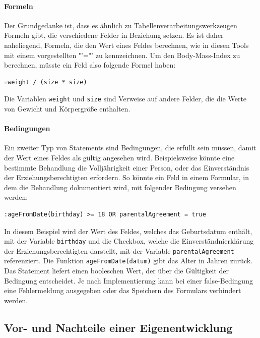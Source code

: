 \paragraph*{Formeln}

Der Grundgedanke ist, dass es ähnlich zu Tabellenverarbeitungs\-werkzeugen Formeln gibt, die verschiedene Felder in Beziehung setzen. Es ist daher naheliegend, Formeln, die den Wert eines Feldes berechnen,	 wie in diesen Tools mit einem vorgestellten "'="' zu kennzeichnen. Um den Body-Mass-Index zu berechnen, müsste ein Feld also folgende Formel haben:

\begin{verbatim}
=weight / (size * size)
\end{verbatim}

Die Variablen \texttt{weight} und \texttt{size} sind Verweise auf andere Felder, die die Werte von Gewicht und Körpergröße enthalten.

\paragraph*{Bedingungen}

Ein zweiter Typ von Statements sind Bedingungen, die erfüllt sein müssen, damit der Wert eines Feldes als gültig angesehen wird. Beispielsweise könnte eine bestimmte Behandlung die Volljährigkeit einer Person, oder das Einverständnis der Erziehungsberechtigten erfordern. So könnte ein Feld in einem Formular, in dem die Behandlung dokumentiert wird, mit folgender Bedingung versehen werden:

\begin{verbatim}
:ageFromDate(birthday) >= 18 OR parentalAgreement = true
\end{verbatim}

In diesem Beispiel wird der Wert des Feldes, welches das Geburtsdatum enthält, mit der Variable \texttt{birthday} und die Checkbox, welche die Einverständnierklärung der Erziehungsberechtigten darstellt, mit der Variable \texttt{parentalAgreement} referenziert. Die Funktion \texttt{ageFromDate(datum)} gibt das Alter in Jahren zurück. Das Statement liefert einen booleschen Wert, der über die Gültigkeit der Bedingung entscheidet. Je nach Implementierung kann bei einer false-Bedingung eine Fehlermeldung ausgegeben oder das Speichern des Formulars verhindert werden.

\subsection{Vor- und Nachteile einer Eigenentwicklung}


